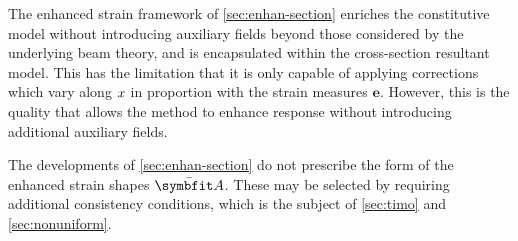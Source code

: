 The enhanced strain framework of \cref{sec:enhan-section} enriches the constitutive model without introducing auxiliary fields beyond those considered by the underlying beam theory, and is encapsulated within the cross-section resultant model. 
This has the limitation that it is only capable of applying corrections which vary along \(x\) in proportion with the strain measures \(\bm{e}\). 
However, this is the quality that allows the method to enhance response without introducing additional auxiliary fields. 

The developments of \cref{sec:enhan-section} do not prescribe the form of the enhanced strain shapes \(\EnhanShapes\). 
These may be selected by requiring additional consistency conditions, which is the subject of \cref{sec:timo} and \cref{sec:nonuniform}.



